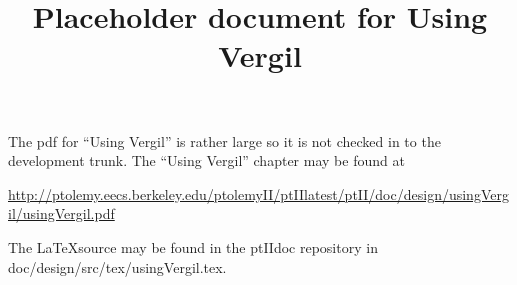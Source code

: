 \documentclass[12pt]{article}
\begin{document}
\title{Placeholder document for Using Vergil}
\maketitle
The pdf for ``Using Vergil'' is rather large so it is not checked in to the development trunk.  The ``Using Vergil'' chapter may be found at

{\scriptsize
\href{http://ptolemy.eecs.berkeley.edu/ptolemyII/ptIIlatest/ptII/doc/design/usingVergil/usingVergil.pdf}{http://ptolemy.eecs.berkeley.edu/ptolemyII/ptIIlatest/ptII/doc/design/usingVergil/usingVergil.pdf}
}

The \LaTeX source may be found in the ptIIdoc repository in\\
 doc/design/src/tex/usingVergil.tex.
\end{document}
